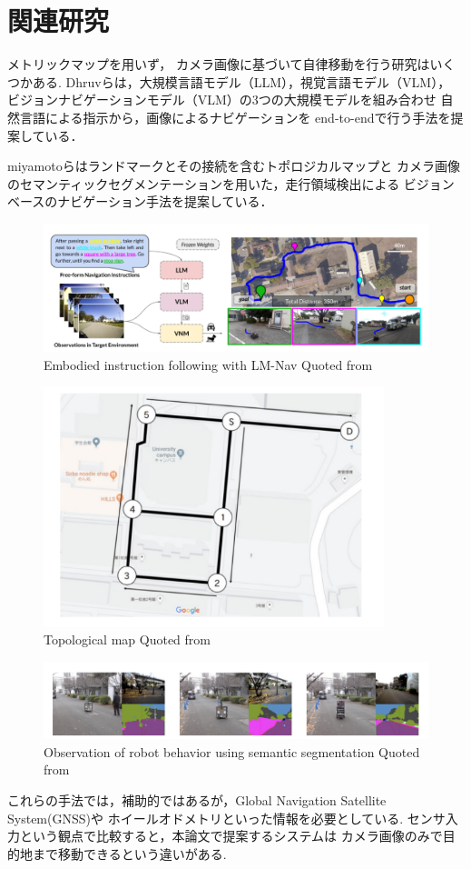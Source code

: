 \section{関連研究}
メトリックマップを用いず，
カメラ画像に基づいて自律移動を行う研究はいくつかある.
Dhruvら\cite{shah2022lmnav}は，大規模言語モデル（LLM），視覚言語モデル（VLM），
ビジョンナビゲーションモデル（VLM）の3つの大規模モデルを組み合わせ
自然言語による指示から，画像によるナビゲーションを
end-to-endで行う手法を提案している．

miyamotoら\cite{miyamoto}はランドマークとその接続を含むトポロジカルマップと
カメラ画像のセマンティックセグメンテーションを用いた，走行領域検出による
ビジョンベースのナビゲーション手法を提案している．
\begin{figure}[htbp]
    \centering
     \includegraphics[width=120mm]{images/pdf/lmnav.pdf}
     \caption{Embodied instruction following with LM-Nav Quoted from\cite{shah2022lmnav}}
     \label{fig:lmnav}
\end{figure}

\begin{figure}[h]
    \centering
     \includegraphics[height=70mm]{images/pdf/topo_meiji.pdf}
     \caption{Topological map Quoted from\cite{miyamoto}}
     \label{fig:topo_meiji}
\end{figure}
\begin{figure}[h]
    \centering
     \includegraphics[width=120mm]{images/pdf/seg_meiji.pdf}
     \caption{Observation of robot behavior using semantic segmentation Quoted from\cite{miyamoto}}
     \label{fig:seg_meiji}
\end{figure}

これらの手法では，補助的ではあるが，Global Navigation Satellite System(GNSS)や
ホイールオドメトリといった情報を必要としている.
センサ入力という観点で比較すると，本論文で提案するシステムは
カメラ画像のみで目的地まで移動できるという違いがある.